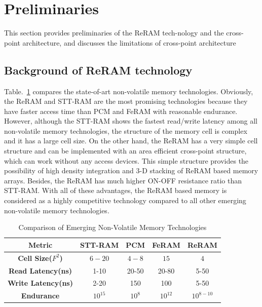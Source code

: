 \section{Preliminaries}\label{sec:preliminary}

This section provides preliminaries of the ReRAM tech-nology and the cross-point architecture, and discusses the limitations of cross-point architecture


\subsection{Background of ReRAM technology}
Table.~\ref{table:compare} compares the state-of-art non-volatile memory technologies. Obviously, the ReRAM and STT-RAM are the most promising technologies because they have faster access time than PCM and FeRAM with reasonable endurance. However, although the STT-RAM shows the fastest read/write latency among all non-volatile memory technologies, the structure of the memory cell is complex and it has a large cell size. On the other hand, the ReRAM has a very simple cell structure and can be implemented with an area efficient cross-point structure, which can work without any access devices. This simple structure provides the possibility of high density integration and 3-D stacking of ReRAM based memory arrays. Besides, the ReRAM has much higher ON-OFF resistance ratio than STT-RAM. With all of these advantages, the ReRAM based memory is considered as a highly competitive technology compared to all other emerging non-volatile memory technologies.

\begin{table}[!tb]
  \centering
  \scriptsize
    \scriptsize
  \caption{Comparison of Emerging Non-Volatile Memory Technologies}\label{table:compare}
  \vspace{-5pt}
  \begin{tabular}{|c|cccc|}
    \hline
    \textbf{Metric} & \textbf{STT-RAM} & \textbf{PCM}    & \textbf{FeRAM} & \textbf{ReRAM}
    \\\hline
    \textbf{Cell Size($F^2$)} & $6-20$ & $4-8$ & $15$ & $4$\\\hline
    \textbf{Read Latency(ns)} &  1-10 & 20-50 & 20-80 & 5-50\\\hline
    \textbf{Write Latency(ns)} & 2-20& 150& 100& 5-50\\\hline
    \textbf{Endurance} &  $10^{15}$ & $10^8$ & $10^{12}$ & $10^{8-10}$\\\hline
  \end{tabular}
  \vspace{-10pt}
\end{table}


